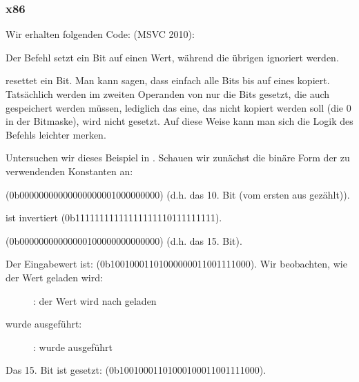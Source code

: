 \subsubsection{x86}


Wir erhalten folgenden Code: (MSVC 2010):



Der \OR Befehl setzt ein Bit auf einen Wert, während die übrigen ignoriert
werden.

\AND resettet ein Bit. Man kann sagen, dass \AND einfach alle Bits bis auf eines
kopiert. Tatsächlich werden im zweiten Operanden von \AND nur die Bits gesetzt,
die auch gespeichert werden müssen, lediglich das eine, das nicht kopiert werden
soll (die 0 in der Bitmaske), wird nicht gesetzt.
Auf diese Weise kann man sich die Logik des Befehls leichter merken.

\clearpage
\mysubparagraph{\olly}

Untersuchen wir dieses Beispiel in \olly.
Schauen wir zunächst die binäre Form der zu verwendenden Konstanten an:

 (0b0000000000000000000{\color{red}1}000000000) (d.h. das 10. Bit
(vom ersten aus gezählt)).

 ist invertiert 
(0b1111111111111111111{\color{red}0}111111111).

 (0b00000000000000{\color{red}1}00000000000000) (d.h. das 15. Bit).

Der Eingabewert ist:  (0b10010001101000000011001111000).
Wir beobachten, wie der Wert geladen wird:

\begin{figure}[H]
\centering
{}
\caption{\olly: der Wert wird nach \ECX geladen}
\label{fig:set_reset_olly1}
\end{figure}

\clearpage
\OR wurde ausgeführt:

\begin{figure}[H]
\centering
{}
\caption{\olly: \OR wurde ausgeführt}
\label{fig:set_reset_olly2}
\end{figure}

Das 15. Bit ist gesetzt:  
(0b10010001101000{\color{red}1}00011001111000).

